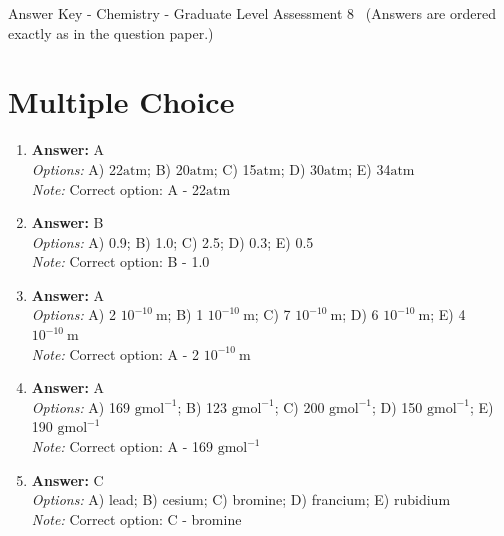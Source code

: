 \documentclass[12pt]{article}
\begin{document}
\begin{center}
Answer Key - Chemistry - Graduate Level Assessment 8 \
\small (Answers are ordered exactly as in the question paper.)
\end{center}

\section*{Multiple Choice}
\begin{enumerate}[label=\arabic*.]
\item \textbf{Answer:} A
\\ \textit{Options:} A) 22$\mathrm{atm}$; B) 20$\mathrm{atm}$; C) 15$\mathrm{atm}$; D) 30$\mathrm{atm}$; E) 34$\mathrm{atm}$
\\ \textit{Note:} Correct option: A - 22$\mathrm{atm}$
\item \textbf{Answer:} B
\\ \textit{Options:} A) 0.9; B) 1.0; C) 2.5; D) 0.3; E) 0.5
\\ \textit{Note:} Correct option: B - 1.0
\item \textbf{Answer:} A
\\ \textit{Options:} A) 2 $10^{-10} \mathrm{~m}$; B) 1 $10^{-10} \mathrm{~m}$; C) 7 $10^{-10} \mathrm{~m}$; D) 6 $10^{-10} \mathrm{~m}$; E) 4 $10^{-10} \mathrm{~m}$
\\ \textit{Note:} Correct option: A - 2 $10^{-10} \mathrm{~m}$
\item \textbf{Answer:} A
\\ \textit{Options:} A) 169 $\mathrm{g} \mathrm{mol}^{-1}$; B) 123 $\mathrm{g} \mathrm{mol}^{-1}$; C) 200 $\mathrm{g} \mathrm{mol}^{-1}$; D) 150 $\mathrm{g} \mathrm{mol}^{-1}$; E) 190 $\mathrm{g} \mathrm{mol}^{-1}$
\\ \textit{Note:} Correct option: A - 169 $\mathrm{g} \mathrm{mol}^{-1}$
\item \textbf{Answer:} C
\\ \textit{Options:} A) lead; B) cesium; C) bromine; D) francium; E) rubidium
\\ \textit{Note:} Correct option: C - bromine
\end{enumerate}
\end{document}
